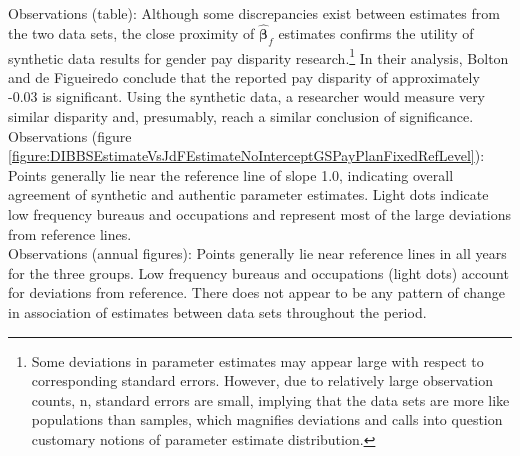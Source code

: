 \documentclass[10pt, letterpaper]{article}
\newcommand{\mest}[1]{\hat{\bm{#1}}}
\begin{document}
\begin{spacing}{1.0}
Observations (table):  Although some discrepancies exist between estimates from the two data sets, the close proximity of $\mest{\beta}_f$ estimates confirms the utility of synthetic data results for gender pay disparity research.\footnote{Some deviations in parameter estimates may appear large with respect to corresponding standard errors.  However, due to relatively large observation counts, n, standard errors are small, implying that the data sets are more like populations than samples, which magnifies deviations and calls into question customary notions of parameter estimate distribution.}  In their analysis, Bolton and de Figueiredo conclude that the reported pay disparity of approximately -0.03 is significant.  Using the synthetic data, a researcher would measure very similar disparity and, presumably, reach a similar conclusion of significance.\\

Observations (figure \ref{figure:DIBBSEstimateVsJdFEstimateNoInterceptGSPayPlanFixedRefLevel}):  Points generally lie near the reference line of slope 1.0, indicating overall agreement of synthetic and authentic parameter estimates.  Light dots indicate low frequency bureaus and occupations and represent most of the large deviations from reference lines.\\

Observations (annual figures):  Points generally lie near reference lines in all years for the three groups.  Low frequency bureaus and occupations (light dots) account for deviations from reference.  There does not appear to be any pattern of change in association of estimates between data sets throughout the period.


\end{spacing}
\end{document}
